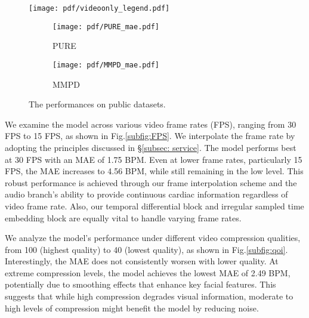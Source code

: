 \begin{figure}[t]
    \centering

    \begin{minipage}{0.8\linewidth}
        \centering
        \texttt{[image: pdf/videoonly\_legend.pdf]}
    \end{minipage}

    \begin{minipage}{0.8\linewidth}
        \begin{subfigure}{.51\linewidth}
            \texttt{[image: pdf/PURE\_mae.pdf]}
            \caption{PURE}
            \label{subfig:res_pure}
        \end{subfigure}\hfill
        \begin{subfigure}{.49\linewidth}
            \texttt{[image: pdf/MMPD\_mae.pdf]}
            \caption{MMPD}
            \label{subfig:res_mmpd}
        \end{subfigure}\hfill
    \end{minipage}
    \caption{The performances on public datasets.}
    \label{fig: res_pure}
\end{figure}




We examine the model across various video frame rates (FPS), ranging from 30 FPS to 15 FPS, as shown in Fig.\ref{subfig:FPS}.  We interpolate the frame rate by adopting the principles discussed in \S\ref{subsec: service}. The model performs best at 30 FPS with an MAE of 1.75 BPM. Even at lower frame rates, particularly 15 FPS, the MAE increases to 4.56 BPM, while still remaining in the low level.  This robust performance is achieved through our frame interpolation scheme and the audio branch's ability to provide continuous cardiac information regardless of video frame rate. Also, our temporal differential block and irregular sampled time embedding block are equally vital to handle varying frame rates.


We analyze the model's performance under different video compression qualities, from 100 (highest quality) to 40 (lowest quality), as shown in Fig.\ref{subfig:qoi}. 
Interestingly, the MAE does not consistently worsen with lower quality. At extreme compression levels, the model achieves the lowest MAE of 2.49 BPM, potentially due to smoothing effects that enhance key facial features. 
This suggests that while high compression degrades visual information, moderate to high levels of compression might benefit the model by reducing noise.

